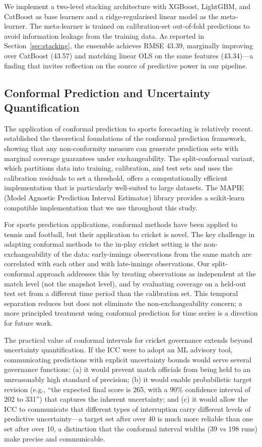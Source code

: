 \documentclass[10pt,a4paper,twocolumn]{article}
\begin{document}
We implement a two-level stacking architecture with XGBoost, LightGBM, and CatBoost as base learners and a ridge-regularised linear model as the meta-learner. The meta-learner is trained on calibration-set out-of-fold predictions to avoid information leakage from the training data. As reported in Section~\ref{sec:stacking}, the ensemble achieves RMSE 43.39, marginally improving over CatBoost (43.57) and matching linear OLS on the same features (43.34)---a finding that invites reflection on the source of predictive power in our pipeline.

\subsection{Conformal Prediction and Uncertainty Quantification}

The application of conformal prediction to sports forecasting is relatively recent. \citet{Vovk2005} established the theoretical foundations of the conformal prediction framework, showing that any non-conformity measure can generate prediction sets with marginal coverage guarantees under exchangeability. The split-conformal variant, which partitions data into training, calibration, and test sets and uses the calibration residuals to set a threshold, offers a computationally efficient implementation that is particularly well-suited to large datasets. The MAPIE (Model Agnostic Prediction Interval Estimator) library provides a scikit-learn compatible implementation that we use throughout this study.

For sports prediction applications, conformal methods have been applied to tennis \citep{Bunker2019} and football, but their application to cricket is novel. The key challenge in adapting conformal methods to the in-play cricket setting is the non-exchangeability of the data: early-innings observations from the same match are correlated with each other and with late-innings observations. Our split-conformal approach addresses this by treating observations as independent at the match level (not the snapshot level), and by evaluating coverage on a held-out test set from a different time period than the calibration set. This temporal separation reduces but does not eliminate the non-exchangeability concern; a more principled treatment using conformal prediction for time series \citep{Vovk2005} is a direction for future work.

The practical value of conformal intervals for cricket governance extends beyond uncertainty quantification. If the ICC were to adopt an ML advisory tool, communicating predictions with explicit uncertainty bounds would serve several governance functions: (a) it would prevent match officials from being held to an unreasonably high standard of precision; (b) it would enable probabilistic target revision (e.g., ``the expected final score is 265, with a 90\% confidence interval of 202 to 331'') that captures the inherent uncertainty; and (c) it would allow the ICC to communicate that different types of interruption carry different levels of predictive uncertainty---a target set after over 40 is much more reliable than one set after over 10, a distinction that the conformal interval widths (39 vs 198 runs) make precise and communicable.
\end{document}
